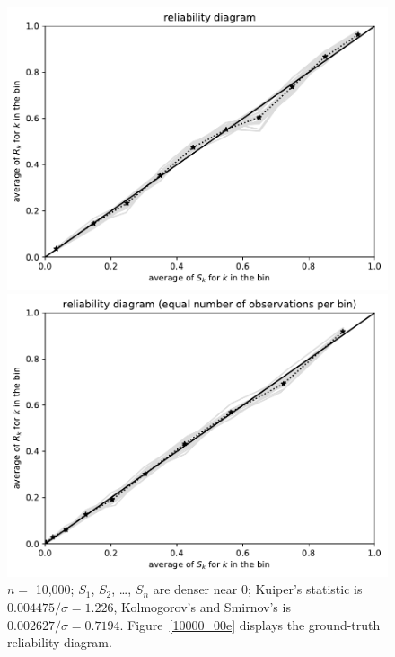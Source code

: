\documentclass{article}
\begin{document}
\begin{figure}
\begin{centering}
\parbox{\imsize}{\includegraphics[width=\imsize]
                {./codes/unweighted/10000_10_1_3/equiprob.pdf}}
\quad\quad
\parbox{\imsize}{\includegraphics[width=\imsize]
                {./codes/unweighted/10000_10_1_3/equisamp.pdf}}

\end{centering}
\caption{$n =$ 10,000; $S_1$, $S_2$, \dots, $S_n$ are denser near 0;
         Kuiper's statistic is $0.004475 / \sigma = 1.226$,
         Kolmogorov's and Smirnov's is $0.002627 / \sigma = 0.7194$.
Figure~\ref{10000_00e} displays the ground-truth reliability diagram.
}
\label{10000_00}
\end{figure}
\end{document}
